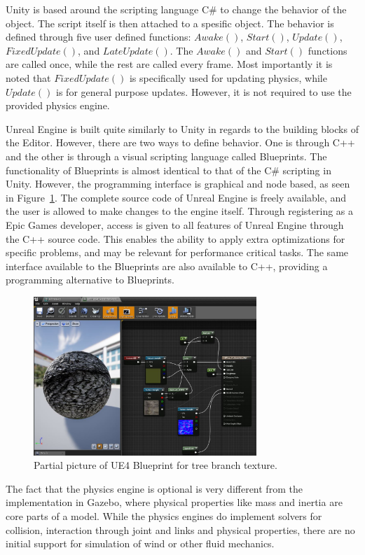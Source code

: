 Unity is based around the scripting language C\# to change the behavior of the object. The script itself is then attached to a spesific object. The behavior is defined through five user defined functions: $Awake()$, $Start()$, $Update()$, $FixedUpdate()$, and $LateUpdate()$. The $Awake()$ and $Start()$ functions are called once, while the rest are called every frame. Most importantly it is noted that $FixedUpdate()$ is specifically used for updating physics, while $Update()$ is for general purpose updates. However, it is not required to use the provided physics engine.

Unreal Engine is built quite similarly to Unity in regards to the building blocks of the Editor. However, there are two ways to define behavior. One is through C++ and the other is through a visual scripting language called Blueprints. The functionality of Blueprints is almost identical to that of the C\# scripting in Unity. However, the programming interface is graphical and node based, as seen in Figure~\ref{fig:blueprint_editor}. The complete source code of Unreal Engine is freely available, and the user is allowed to make changes to the engine itself. Through registering as a Epic Games developer, access is given to all features of Unreal Engine through the C++ source code. This enables the ability to apply extra optimizations for specific problems, and may be relevant for performance critical tasks. The same interface available to the Blueprints are also available to C++, providing a programming alternative to Blueprints.

\begin{figure}[!htb]
    \centering
    \includegraphics[height = 6cm]{rapport/fig/Simulator/blueprintprog.JPG}
    \caption{Partial picture of UE4 Blueprint for tree branch texture.}
    \label{fig:blueprint_editor}
\end{figure}

The fact that the physics engine is optional is very different from the implementation in Gazebo, where physical properties like mass and inertia are core parts of a model. While the physics engines do implement solvers for collision, interaction through joint and links and physical properties, there are no initial support for simulation of wind or other fluid mechanics.

